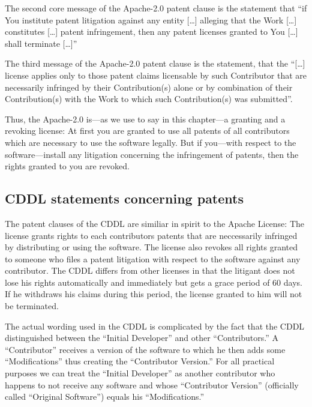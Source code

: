 The second core message of the Apache-2.0 patent clause is the statement that
\enquote{if You institute patent litigation against any entity [\ldots] alleging
that the Work [\ldots] constitutes [\ldots] patent infringement, then any patent
licenses granted to You [\ldots] shall terminate [\ldots]}

The third message of the Apache-2.0 patent clause is the statement, that the
\enquote{[\ldots] license applies only to those patent claims licensable by such
Contributor that are necessarily infringed by their Contribution(s) alone or by
combination of their Contribution(s) with the Work to which such Contribution(s)
was submitted}.

Thus, the Apache-2.0 is---as we use to say in this chapter---a granting and a
revoking license: At first you are granted to use all patents of all
contributors which are necessary to use the software legally. But if you---with
respect to the software---install any litigation concerning the infringement of
patents, then the rights granted to you are revoked.

\subsection{CDDL statements concerning patents}

The patent clauses of the CDDL are similiar in spirit to the Apache License: 
The license grants rights to each contributors patents that are neccessarily
infringed by distributing or using the software. The license also revokes all
rights granted to someone who files a patent litigation with respect to the
software against any contributor.  The CDDL differs from other licenses in that
the litigant does not lose his rights automatically and immediately but gets a
grace period of 60 days. If he withdraws his claims during this period, the
license granted to him will not be terminated.

The actual wording used in the CDDL is complicated by the fact that the CDDL
distinguished between the \enquote{Initial Developer} and other
\enquote{Contributors.}  A \enquote{Contributor} receives a version of the
software to which he then adds some \enquote{Modifications} thus creating the
\enquote{Contributor Version.} For all practical purposes we can treat the
\enquote{Initial Developer} as another contributor who happens to not receive
any software and whose \enquote{Contributor Version} (officially called
\enquote{Original Software}) equals his \enquote{Modifications.}

